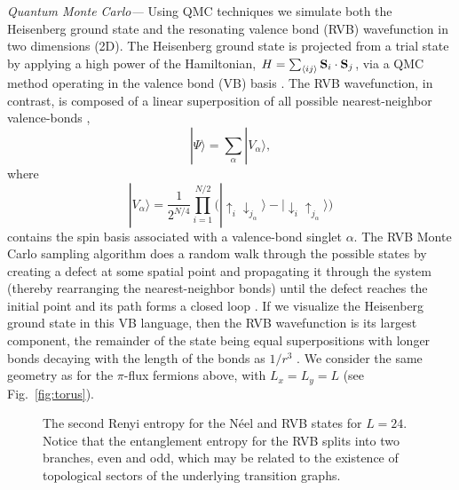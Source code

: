 \documentclass[prl,aps,twocolumn,floatfix,amsmath,amssymb,superscriptaddress,tightenlines]{revtex4}
\begin{document}
{\it Quantum Monte Carlo---}
Using QMC techniques we simulate both the
Heisenberg ground state and the resonating valence bond (RVB)
wavefunction in two dimensions (2D).  The Heisenberg ground state is
projected from a trial state by applying a high power of the
Hamiltonian, $H = \sum_{\langle ij \rangle} {\bf S}_i \cdot {\bf S}_j$, via a QMC method operating in the valence bond (VB)
basis \cite{Sandvik}. %
The RVB wavefunction, in contrast, 
is composed of a linear superposition of all possible 
nearest-neighbor valence-bonds \cite{RVB1,RVB2},
\begin{equation}
| \Psi \rangle = \sum_{\alpha} | V_{\alpha} \rangle,
\end{equation}
where
\begin{equation}
|V_{\alpha} \rangle =  \frac{1}{2^{N/4}} \prod_{i=1}^{N/2} \big( | \uparrow_i \downarrow_{j_{\alpha}} \rangle -  | \downarrow_i  \uparrow_{j_{\alpha}} \rangle \big)
\end{equation}
contains the spin basis associated with a valence-bond singlet $\alpha$.
The RVB 
Monte Carlo sampling
algorithm does a random walk through the possible states by creating a
defect at some spatial point and propagating it through the system (thereby
rearranging the nearest-neighbor bonds) until the defect reaches the
initial point and its path forms a closed loop \cite{AWSloop}.
If we visualize the Heisenberg ground state in this VB language, then the RVB wavefunction is its largest component, the remainder of the state being equal superpositions with longer bonds decaying with the length of the bonds as $1/r^3$ \cite{Sandvik}.
We consider the same geometry as for the $\pi$-flux fermions above, with $L_x=L_y=L$ (see Fig.~\ref{fig:torus}).

 \begin{figure}
   \begin{center}
   \end{center}
   \caption{ The second Renyi entropy for the N\'eel and RVB states for $L=24$. Notice that the entanglement entropy for the RVB splits into two branches, even and odd, which may be related to the existence of topological sectors of the underlying transition graphs.
   \label{fig:heis_bow} }
 \end{figure}
\end{document}
